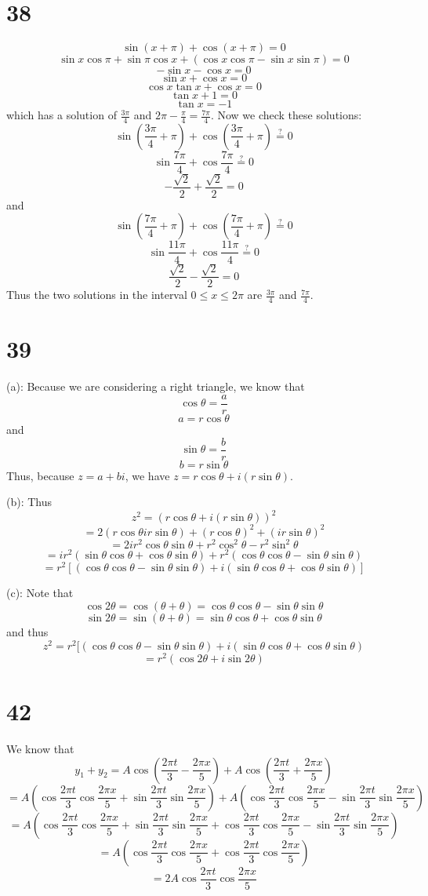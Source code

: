 \documentclass{article}
\theoremstyle{definition}
\newcommand{\?}{\stackrel{?}{=}}
\begin{document}
\section*{38}
\[ \sin(x+\pi)+\cos(x+\pi)=0 \]
\[ \sin x\cos\pi+\sin\pi\cos x+(\cos x\cos\pi-\sin x\sin\pi)=0 \]
\[ -\sin x-\cos x=0 \]
\[ \sin x+\cos x=0 \]
\[ \cos x\tan x+\cos x=0 \]
\[ \tan x+1=0 \]
\[ \tan x=-1 \]
which has a solution of $\frac{3\pi}{4}$ and $2\pi-\frac{\pi}{4}=\frac{7\pi}{4}$. Now we check these solutions:
\[ \sin(\frac{3\pi}{4}+\pi)+\cos(\frac{3\pi}{4}+\pi)\? 0 \]
\[ \sin\frac{7\pi}{4}+\cos\frac{7\pi}{4}\? 0 \]
\[ -\frac{\sqrt{2}}{2}+\frac{\sqrt{2}}{2}=0 \]
and
\[ \sin(\frac{7\pi}{4}+\pi)+\cos(\frac{7\pi}{4}+\pi)\? 0 \]
\[ \sin\frac{11\pi}{4}+\cos\frac{11\pi}{4}\? 0 \]
\[ \frac{\sqrt{2}}{2}-\frac{\sqrt{2}}{2}=0 \]
Thus the two solutions in the interval $0\le x\le 2\pi$ are $\frac{3\pi}{4}$ and $\frac{7\pi}{4}$.

\section*{39}
(a): Because we are considering a right triangle, we know that \[ \cos\theta=\frac{a}{r} \] \[ a=r\cos\theta \] and
\[ \sin\theta=\frac{b}{r} \] \[ b=r\sin\theta \]
Thus, because $z=a+bi$, we have $z=r\cos\theta+i(r\sin\theta)$.


(b): Thus
\[ z^2=(r\cos\theta+i(r\sin\theta))^2 \]
\[ =2(r\cos\theta ir\sin\theta)+(r\cos\theta)^2+(ir\sin\theta)^2 \]
\[ =2ir^2\cos\theta\sin\theta+r^2\cos^2\theta-r^2\sin^2\theta \]
\[ =ir^2(\sin\theta\cos\theta+\cos\theta\sin\theta)+r^2(\cos\theta\cos\theta-\sin\theta\sin\theta) \]
\[ =r^2[(\cos\theta\cos\theta-\sin\theta\sin\theta)+i(\sin\theta\cos\theta+\cos\theta\sin\theta)] \]


(c):
Note that \[ \cos 2\theta=\cos(\theta+\theta)=\cos\theta\cos\theta-\sin\theta\sin\theta \]
\[ \sin 2\theta=\sin(\theta+\theta)=\sin\theta\cos\theta+\cos\theta \sin\theta \]
and thus
\[ z^2=r^2[(\cos\theta\cos\theta-\sin\theta\sin\theta)+i(\sin\theta\cos\theta+\cos\theta\sin\theta) \]
\[ =r^2(\cos 2\theta+i\sin 2\theta) \]

\section*{42}
We know that
\[ y_1+y_2=A\cos(\frac{2\pi t}{3}-\frac{2\pi x}{5})+A\cos(\frac{2\pi t}{3}+\frac{2\pi x}{5}) \]
\[ =A(\cos\frac{2\pi t}{3}\cos\frac{2\pi x}{5}+\sin\frac{2\pi t}{3}\sin\frac{2\pi x}{5})+A(\cos\frac{2\pi t}{3}\cos\frac{2\pi x}{5}-\sin\frac{2\pi t}{3}\sin\frac{2\pi x}{5}) \]
\[ =A(\cos\frac{2\pi t}{3}\cos\frac{2\pi x}{5}+\sin\frac{2\pi t}{3}\sin\frac{2\pi x}{5}+\cos\frac{2\pi t}{3}\cos\frac{2\pi x}{5}-\sin\frac{2\pi t}{3}\sin\frac{2\pi x}{5}) \]
\[ =A(\cos\frac{2\pi t}{3}\cos\frac{2\pi x}{5}+\cos\frac{2\pi t}{3}\cos\frac{2\pi x}{5}) \]
\[ =2A\cos\frac{2\pi t}{3}\cos\frac{2\pi x}{5} \]
\end{document}
